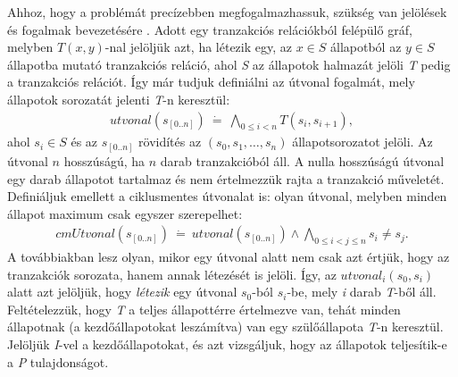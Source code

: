 Ahhoz, hogy a problémát precízebben megfogalmazhassuk, szükség van jelölések és fogalmak bevezetésére \cite{k_induction_article}. Adott egy tranzakciós relációkból felépülő gráf, melyben $T(x, y)$-nal jelöljük azt, ha létezik egy, az $x \in S$ állapotból az $y \in S$ állapotba mutató tranzakciós reláció, ahol \emph{S} az állapotok halmazát jelöli \textit{T} pedig a tranzakciós relációt. Így már tudjuk definiálni az útvonal fogalmát, mely állapotok sorozatát jelenti \emph{T}-n keresztül:
\begin{align}
	\label{eq:relacio_sor}
	\mathit{utvonal}(s_{[0..n]})~\dot{=}~\bigwedge_{0 \leq i < n} T(s_{i}, s_{i+1}),
\end{align}
ahol $s_i \in S$ és az $s_{[0..n]}$ rövidítés az $(s_{0}, s_{1}, \dots, s_{n})$ állapotsorozatot jelöli. Az útvonal $n$ hosszúságú, ha $n$ darab tranzakcióból áll. A nulla hosszúságú útvonal egy darab állapotot tartalmaz és nem értelmezzük rajta a tranzakció műveletét.
\newline
\newline
Definiáljuk emellett a ciklusmentes útvonalat is: olyan útvonal, melyben minden állapot maximum csak egyszer szerepelhet:
\begin{align}
	\mathit{cmUtvonal}(s_{[0..n]})~\dot{=}~\mathit{utvonal}(s_{[0..n]}) \wedge \bigwedge_{0 \leq i < j \leq n} s_{i} \neq s_{j}.
\end{align}
A továbbiakban lesz olyan, mikor egy útvonal alatt nem csak azt értjük, hogy az tranzakciók sorozata, hanem annak létezését is jelöli. Így, az $\mathit{utvonal}_{i}(s_{0}, s_{i})$ alatt azt jelöljük, hogy \emph{létezik} egy útvonal $s_{0}$-ból $s_{i}$-be, mely \emph{i} darab \emph{T}-ből áll.
\newline
\newline
Feltételezzük, hogy \emph{T} a teljes állapottérre értelmezve van, tehát minden állapotnak (a kezdőállapotokat leszámítva) van egy szülőállapota \emph{T}-n keresztül. Jelöljük \emph{I}-vel a kezdőállapotokat, és azt vizsgáljuk, hogy az állapotok teljesítik-e a \emph{P} tulajdonságot.

